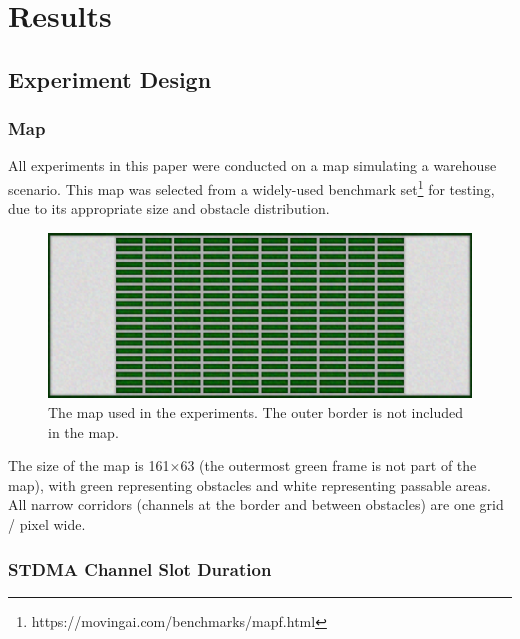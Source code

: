 \chapter{Results}
\label{chap:Results}



\section{Experiment Design}

\subsection*{Map}
\label{chap:map}

All experiments in this paper were conducted on a map simulating a warehouse scenario.
This map was selected from a widely-used benchmark set\cite{stern2019mapf}\footnote{https://movingai.com/benchmarks/mapf.html} for testing, due to its appropriate size and obstacle distribution.

\begin{figure}[htbp]
    \centering
    \includegraphics*[width = \linewidth]{figures/map(color).png}
    \caption{The map used in the experiments. The outer border is not included in the map.}
    \label{fig:Map}
\end{figure}

The size of the map is 161$\times$63 (the outermost green frame is not part of the map), 
with green representing obstacles and white representing passable areas.
All narrow corridors (channels at the border and between obstacles) are one grid / pixel wide.

\subsection*{STDMA Channel Slot Duration}

